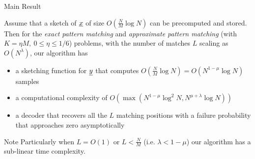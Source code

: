 	 \begin{frame}{Main Result}
	 	
	 \begin{theorem}
	 	Assume that a sketch of $\underline{x}$ of size $O(\frac{N}{M}\log N)$ can be precomputed and stored. Then for the {\it exact pattern matching} and {\it approximate pattern matching} (with $K = \eta M,~ 0 \leq \eta \leq 1/6$) problems, with the number of matches $L$ scaling as $O(N^{\lambda})$, our algorithm has
	 	\begin{itemize}
	 		\item a sketching function for $\underline{y}$ that computes {\color{blue} $O(\frac{N}{M}\log N)=O(N^{1-\mu}\log N)$} \alert{samples}
	 		\item a \alert{computational complexity} of 
	 		{\color{blue}$O(\max(N^{1-\mu}\log^2 N, N^{\mu+\lambda}\log N ))$}
	 		
	 		\item a decoder that recovers all the $L$ matching positions with a {\color{blue}failure probability that approaches zero asymptotically} 
	 	\end{itemize}
	 	
	 \end{theorem}
	 \pause
	 \begin{block}{\alert{Note}}
	 	Particularly when $L=O(1)$ or $L<\frac{N}{M}$ (i.e. $\lambda<1-\mu$) our algorithm has a {\color{blue}sub-linear time} complexity.
	 \end{block}	 
\end{frame}	 


